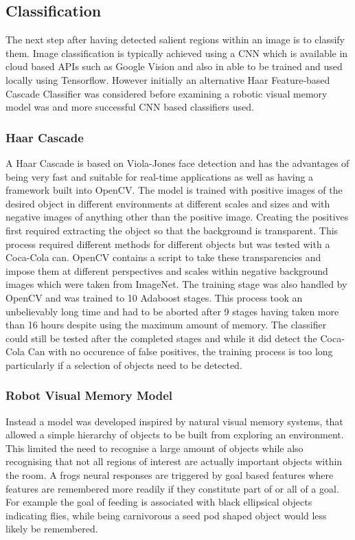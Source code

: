 \documentclass{mproj}
\begin{document}
\subsection{Classification}

The next step after having detected salient regions within an image is to classify them. Image classification is typically achieved using a CNN which is available in cloud based APIs such as Google Vision and also in able to be trained and used locally using Tensorflow. However initially an alternative Haar Feature-based Cascade Classifier was considered before examining a robotic visual memory model was and more successful CNN based classifiers used.

\subsubsection{Haar Cascade}

A Haar Cascade is based on Viola-Jones face detection and has the advantages of being very fast and suitable for real-time applications\cite{viola} as well as having a framework built into OpenCV. The model is trained with positive images of the desired object in different environments at different scales and sizes and with negative images of anything other than the positive image. Creating the positives first required extracting the object so that the background is transparent. This process required different methods for different objects but was tested with a Coca-Cola can. OpenCV contains a script to take these transparencies and impose them at different perspectives and scales within negative background images which were taken from ImageNet\cite{imagenet}. The training stage was also handled by OpenCV and was trained to 10 Adaboost stages. This process took an unbelievably long time and had to be aborted after 9 stages having taken more than 16 hours despite using the maximum amount of memory. The classifier could still be tested after the completed stages and while it did detect the Coca-Cola Can with no occurence of false positives, the training process is too long particularly if a selection of objects need to be detected.    

\subsubsection{Robot Visual Memory Model}

Instead a model was developed inspired by natural visual memory systems, that  allowed a simple hierarchy of objects to be built from exploring an environment. This limited the need to recognise a large amount of objects while also recognising that not all regions of interest are actually important objects within the room. A frogs neural responses are triggered by goal based features where features are remembered more readily if they constitute part of or all of a goal. For example the goal of feeding is associated with black ellipsical objects indicating flies, while being carnivorous a seed pod shaped object would less likely be remembered.
\end{document}
